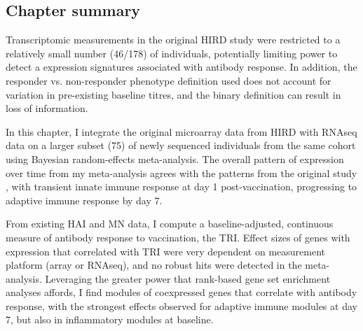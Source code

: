 \subsection{Chapter summary}

Transcriptomic measurements in the original \gls{HIRD} study were restricted to a relatively small number (46/178) of individuals, potentially limiting power to detect a expression signatures associated with antibody response.
In addition, the responder vs. non-responder phenotype definition used does not account for variation in pre-existing baseline titres, and the binary definition can result in loss of information\autocite{cohen1983CostDichotomization, senn2005DichotomaniaObsessiveCompulsive, fedorov2009ConsequencesDichotomization}.

In this chapter, I integrate the original microarray data from \gls{HIRD} with \gls{RNAseq} data on a larger subset (75) of newly sequenced individuals from the same cohort using Bayesian random-effects meta-analysis.
The overall pattern of expression over time from my meta-analysis agrees with the patterns from the original study \autocite{sobolev2016AdjuvantedInfluenzaH1N1Vaccination}, with transient innate immune response at day 1 post-vaccination, progressing to adaptive immune response by day 7.

From existing \gls{HAI} and \gls{MN} data, I compute a baseline-adjusted, continuous measure of antibody response to vaccination, the \gls{TRI}\autocite{bucasas2011EarlyPatternsGene}.
Effect sizes of genes with expression that correlated with \gls{TRI} were very dependent on measurement platform (array or \gls{RNAseq}), and no robust hits were detected in the meta-analysis.
Leveraging the greater power that rank-based gene set enrichment analyses affords, I find modules of coexpressed genes that correlate with antibody response, with the strongest effects observed for adaptive immune modules at day 7, but also in inflammatory modules at baseline.

